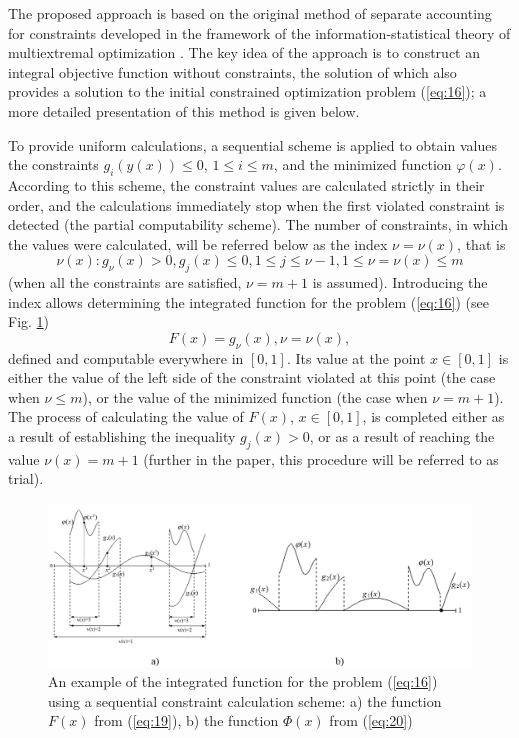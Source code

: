 \documentclass[smallextended]{svjour3}       %
\begin{document}
The proposed approach is based on the original method of separate accounting for constraints developed in the framework of the information-statistical theory of multiextremal optimization \cite{c18}. The key idea of the approach is to construct an integral objective function without constraints, the solution of which also provides a solution to the initial constrained optimization problem (\ref{eq:16}); a more detailed presentation of this method is given below.

To provide uniform calculations, a sequential scheme is applied to obtain values the constraints $g_i(y(x)) \leq 0$, $1 \leq i \leq m$, and the minimized function $\varphi(x)$. According to this scheme, the constraint values are calculated strictly in their order, and the calculations immediately stop when the first violated constraint is detected (the partial computability scheme). The number of constraints, in which the values were calculated, will be referred below as the index $\nu=\nu(x)$, that is
\begin{equation}\label{eq:18}
\nu(x) : g_\nu(x)>0, g_j(x)\leq 0, 1 \leq j \leq \nu - 1, 1 \leq \nu = \nu(x) \leq m
\end{equation}
(when all the constraints are satisfied, $\nu=m+1$ is assumed). Introducing the index allows determining the integrated function for the problem (\ref{eq:16}) (see Fig. \ref{fig:1})
\begin{equation}\label{eq:19}
F(x)=g_\nu(x), \nu=\nu(x),
\end{equation}
defined and computable everywhere in $[0,1]$. Its value at the point $x\in [0,1]$ is either the value of the left side of the constraint violated at this point (the case when $\nu \leq m$), or the value of the minimized function (the case when $\nu = m + 1$). The process of calculating the value of $F(x)$, $x\in [0,1]$, is completed either as a result of establishing the inequality $g_j(x)>0$, or as a result of reaching the value $\nu(x)=m+1$ (further in the paper, this procedure will be referred to as trial).

\begin{figure}
  \centering
  \includegraphics[width=\linewidth]{fig1}
  \caption{An example of the integrated function for the problem (\ref{eq:16}) using a sequential constraint calculation scheme: a) the function $F(x)$ from (\ref{eq:19}), b) the function $\Phi(x)$ from (\ref{eq:20})}
  \label{fig:1}
\end{figure}
\end{document}
